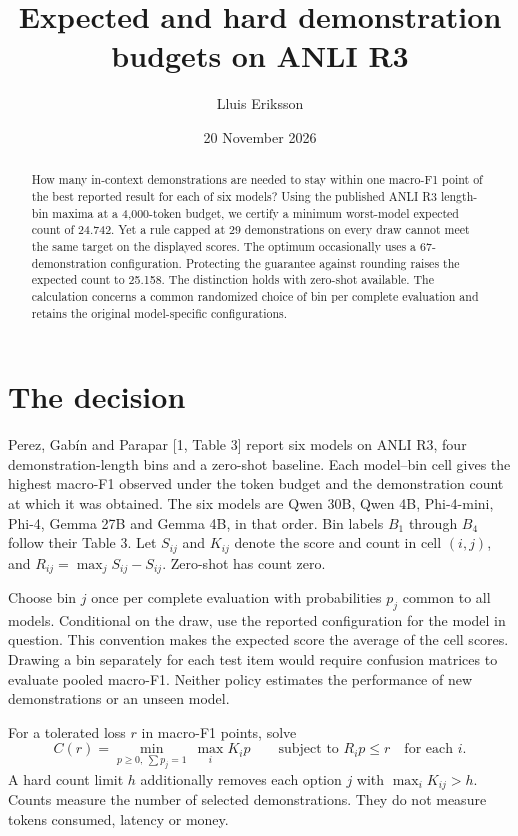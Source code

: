 \documentclass[11pt]{article}
\title{Expected and hard demonstration budgets on ANLI R3}
\author{Lluis Eriksson}
\date{20 November 2026}
\begin{document}
\maketitle
\begin{abstract}
How many in-context demonstrations are needed to stay within one macro-F1 point of the best reported result for each of six models? Using the published ANLI R3 length-bin maxima at a 4,000-token budget, we certify a minimum worst-model expected count of 24.742. Yet a rule capped at 29 demonstrations on every draw cannot meet the same target on the displayed scores. The optimum occasionally uses a 67-demonstration configuration. Protecting the guarantee against rounding raises the expected count to 25.158. The distinction holds with zero-shot available. The calculation concerns a common randomized choice of bin per complete evaluation and retains the original model-specific configurations.
\end{abstract}
\section{The decision}
Perez, Gab\'in and Parapar [1, Table 3] report six models on ANLI R3, four demonstration-length bins and a zero-shot baseline. Each model--bin cell gives the highest macro-F1 observed under the token budget and the demonstration count at which it was obtained. The six models are Qwen 30B, Qwen 4B, Phi-4-mini, Phi-4, Gemma 27B and Gemma 4B, in that order. Bin labels $B_1$ through $B_4$ follow their Table 3. Let $S_{ij}$ and $K_{ij}$ denote the score and count in cell $(i,j)$, and $R_{ij}=\max_j S_{ij}-S_{ij}$. Zero-shot has count zero.

Choose bin $j$ once per complete evaluation with probabilities $p_j$ common to all models. Conditional on the draw, use the reported configuration for the model in question. This convention makes the expected score the average of the cell scores. Drawing a bin separately for each test item would require confusion matrices to evaluate pooled macro-F1. Neither policy estimates the performance of new demonstrations or an unseen model.

For a tolerated loss $r$ in macro-F1 points, solve
\[
 C(r)=\min_{p\ge0,\ \sum p_j=1}\ \max_i K_i p
       \qquad\text{subject to } R_i p\le r\quad\text{for each }i .
\]
A hard count limit $h$ additionally removes each option $j$ with $\max_i K_{ij}>h$. Counts measure the number of selected demonstrations. They do not measure tokens consumed, latency or money.
\end{document}
